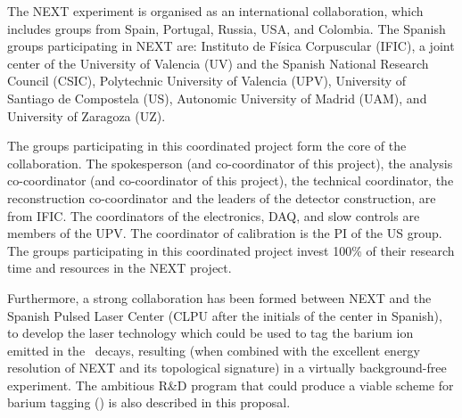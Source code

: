 The NEXT experiment is organised as an international collaboration, which includes groups from Spain, Portugal, Russia, USA, and Colombia. The Spanish groups participating in NEXT are: Instituto de Física Corpuscular (IFIC), a joint center of the University of Valencia (UV) and the Spanish National Research Council (CSIC), Polytechnic University of Valencia (UPV), University of Santiago de Compostela (US), Autonomic University of Madrid (UAM), and University of Zaragoza (UZ). 

The groups participating in this coordinated project form the core of the collaboration. The spokesperson (and co-coordinator of this project), the analysis co-coordinator (and co-coordinator of this project), the technical coordinator, the reconstruction co-coordinator and the leaders of the detector construction, are from IFIC. The coordinators of the electronics, DAQ, and slow controls are members of the UPV. The coordinator of calibration is the PI of the US group. The groups participating in this coordinated project invest 100\% of their research time and resources in the NEXT project. 

Furthermore, a strong collaboration has been  formed between NEXT and the Spanish Pulsed Laser Center (CLPU after the initials of the center in Spanish), to develop the laser technology which could be used to tag the barium ion emitted in the \bb\ decays, resulting (when combined with the excellent energy resolution of NEXT and its topological signature) in a virtually background-free experiment. The ambitious R\&D program that could produce a viable scheme for barium tagging (\BATA) is also described in this proposal.  

%


